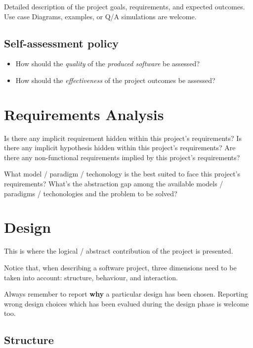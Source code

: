 \documentclass{scrartcl}
\begin{document}
    Detailed description of the project goals, requirements, and expected outcomes.
%
    Use case Diagrams, examples, or Q/A simulations are welcome.

    \subsection{Self-assessment policy}

    \begin{itemize}
        \item How should the \emph{quality} of the \emph{produced software} be assessed?

        \item How should the \emph{effectiveness} of the project outcomes be assessed?
    \end{itemize}


    \section{Requirements Analysis}

    Is there any implicit requirement hidden within this project's requirements?
%
    Is there any implicit hypothesis hidden within this project's requirements?
%
    Are there any non-functional requirements implied by this project's requirements?

    What model / paradigm / techonology is the best suited to face this project's requirements?
%
    What's the abstraction gap among the available models / paradigms / techonologies and the problem to be solved?


    \section{Design}

    This is where the logical / abstract contribution of the project is presented.

    Notice that, when describing a software project, three dimensions need to be taken into account: structure, behaviour, and interaction.

    Always remember to report \textbf{why} a particular design has been chosen.
    Reporting wrong design choices which has been evalued during the design phase is welcome too.

    \subsection{Structure}
\end{document}
